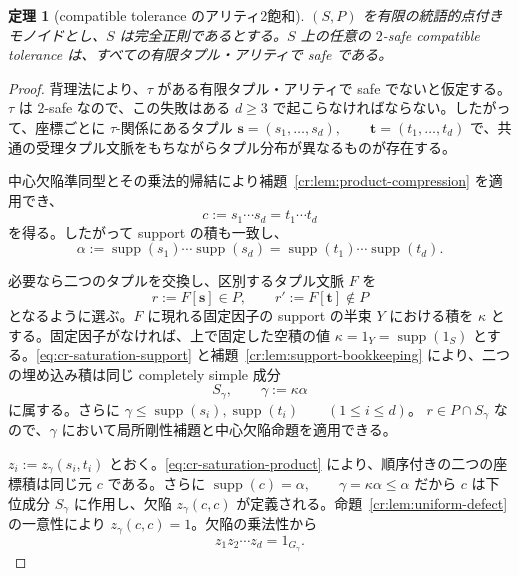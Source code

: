 \documentclass[10pt,a4paper]{ltjsarticle}
\newtheorem{theorem}{定理}[section]
\theoremstyle{definition}
\theoremstyle{remark}
\begin{document}
\begin{theorem}[compatible tolerance のアリティ2飽和]
\label{cr:thm:tolerance-saturation}
$(S,P)$ を有限の統語的点付きモノイドとし、$S$ は完全正則であるとする。$S$ 上の任意の $2$-safe compatible tolerance は、すべての有限タプル・アリティで safe である。
\end{theorem}

\begin{proof}
背理法により、$\tau$ がある有限タプル・アリティで safe でないと仮定する。$\tau$ は $2$-safe なので、この失敗はある $d\ge3$ で起こらなければならない。したがって、座標ごとに $\tau$-関係にあるタプル
\(\mathbf s=(s_1,\ldots,s_d), \qquad \mathbf t=(t_1,\ldots,t_d)\)
で、共通の受理タプル文脈をもちながらタプル分布が異なるものが存在する。

中心欠陥準同型とその乗法的帰結により補題~\ref{cr:lem:product-compression} を適用でき、
\begin{equation}
c
:=
s_1\cdots s_d
=
t_1\cdots t_d
\label{eq:cr-saturation-product}
\end{equation}
を得る。したがって support の積も一致し、
\begin{equation}
\alpha
:=
\operatorname{supp}(s_1)\cdots\operatorname{supp}(s_d)
=
\operatorname{supp}(t_1)\cdots\operatorname{supp}(t_d).
\label{eq:cr-saturation-support}
\end{equation}

必要なら二つのタプルを交換し、区別するタプル文脈 $F$ を
\begin{equation}
r:=F[\mathbf s]\in P,
\qquad
r':=F[\mathbf t]\notin P
\label{eq:cr-distinguishing-context}
\end{equation}
となるように選ぶ。$F$ に現れる固定因子の support の半束 $Y$ における積を $\kappa$ とする。固定因子がなければ、上で固定した空積の値
$\kappa=1_Y=\operatorname{supp}(1_S)$
とする。\eqref{eq:cr-saturation-support} と補題~\ref{cr:lem:support-bookkeeping} により、二つの埋め込み積は同じ completely simple 成分
\begin{equation}
S_\gamma,
\qquad
\gamma:=\kappa\alpha
\label{eq:cr-gamma-component}
\end{equation}
に属する。さらに
\(\gamma \le \operatorname{supp}(s_i), \operatorname{supp}(t_i) \qquad(1\le i\le d)\)。
$r\in P\cap S_\gamma$ なので、$\gamma$ において局所剛性補題と中心欠陥命題を適用できる。

\(z_i:=z_\gamma(s_i,t_i)\) とおく。\eqref{eq:cr-saturation-product} により、順序付きの二つの座標積は同じ元 $c$ である。さらに
\(\operatorname{supp}(c)=\alpha, \qquad \gamma=\kappa\alpha\le\alpha\)
だから $c$ は下位成分 $S_\gamma$ に作用し、欠陥 $z_\gamma(c,c)$ が定義される。命題~\ref{cr:lem:uniform-defect} の一意性により $z_\gamma(c,c)=1$。欠陥の乗法性から
\begin{equation}
z_1z_2\cdots z_d
=
1_{G_\gamma}.
\label{eq:cr-saturation-defect-one}
\end{equation}


\end{proof}
\end{document}

